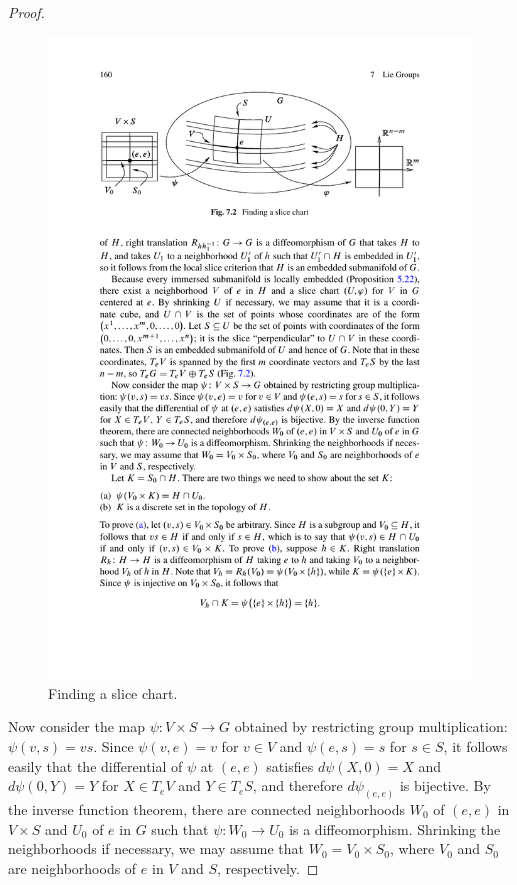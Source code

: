 \begin{proof}
\begin{figure}[htbp]
\centering
\includegraphics{pictures/Lie-closed-2}
\caption{Finding a slice chart.}
\end{figure}\par
Now consider the map $\psi:V\times S\to G$ obtained by restricting group multiplication: $\psi(v,s)=vs$. Since $\psi(v,e)=v$ for $v\in V$ and $\psi(e,s)=s$ for $s\in S$, it follows easily that the differential of $\psi$ at $(e,e)$ satisfies $d\psi(X,0)=X$ and $d\psi(0,Y)=Y$ for $X\in T_eV$ and $Y\in T_eS$, and therefore $d\psi_{(e,e)}$ is bijective. By the inverse function theorem, there are connected neighborhoods $W_0$ of $(e,e)$ in $V\times S$ and $U_0$ of $e$ in $G$ such that $\psi:W_0\to U_0$ is a diffeomorphism. Shrinking the neighborhoods if necessary, we may assume that $W_0=V_0\times S_0$, where $V_0$ and $S_0$ are neighborhoods of $e$ in $V$ and $S$, respectively.\par

\end{proof}
